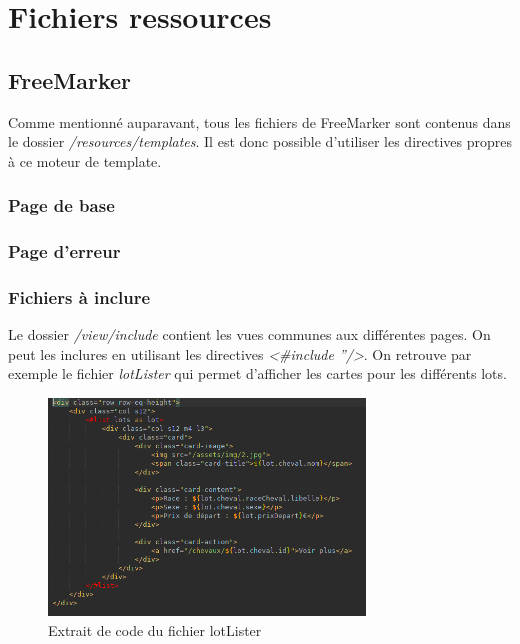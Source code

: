 	\section{Fichiers ressources}

		\subsection{FreeMarker}

			Comme mentionné auparavant, tous les fichiers de FreeMarker sont contenus dans le dossier \textit{/resources/templates}. Il est donc possible d'utiliser les directives propres à ce moteur de template.

			\subsubsection{Page de base}


			\subsubsection{Page d'erreur}


			\subsubsection{Fichiers à inclure}

				Le dossier \textit{/view/include} contient les vues communes aux différentes pages. On peut les inclures en utilisant les directives \textit{<\#include ''/>}. On retrouve par exemple le fichier \textit{lotLister} qui permet d'afficher les cartes pour les différents lots.

				\begin{figure}[H]
					\centering\includegraphics[width=0.75\textwidth, keepaspectratio]{res/include-lotLister.png}
					\caption{Extrait de code du fichier lotLister}
				\end{figure}

